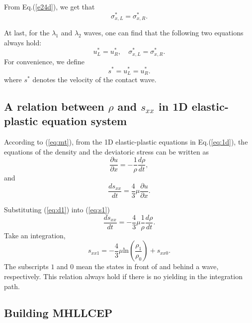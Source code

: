 \documentclass{article}
\numberwithin{equation}{section}
\numberwithin{table}{section}
\begin{document}
From  Eq.(\ref{e24d}), we  get that
\begin{equation}   \label{e27a}
\sigma_{x,L} ^{\ast}=  \sigma_{x,R} ^{\ast}.
\end{equation}


At last, for the $\lambda_{1}$ and $\lambda_{2}$ waves, one can find
that the following two equations always hold:
\begin{equation}   \label{e28}
u_{L}^{\ast}=u_{R}^{\ast}, \quad
\sigma_{x,L}^{\ast}=\sigma_{x,R}^{\ast}.
\end{equation}
For convenience, we define
\begin{equation}\label{eq:contact}
  s^* = u_L^* = u_R^*. %
\end{equation}
where $s^*$ denotes the velocity of the contact wave.
\subsection{A relation between $\rho$ and $s_{xx}$ in 1D elastic-plastic  equation system}

According  to (\ref{eq:mt}), from the 1D elastic-plastic  equations in Eq.(\ref{eq:1d}), the equations of the density and the deviatoric stress can be written as
  \begin{equation}\label{eq:d1}
	\frac{\partial u}{\partial x} = -\frac{1}{\rho}\frac{d\rho}{dt},
  \end{equation}
  and
  \begin{equation}\label{eq:s1}
	\frac{ds_{xx}}{dt}=\frac{4}{3}\mu\frac{\partial u}{\partial x}.
  \end{equation}

  Substituting (\ref{eq:d1}) into (\ref{eq:s1}) 
  \begin{equation}
	\frac{ds_{xx}}{dt}=-\frac{4}{3}\mu \frac{1}{\rho}\frac{d\rho}{dt}.
\end{equation}
Take an integration,
\begin{equation}\label{eq:rhosxx}
  s_{xx1}=-\frac{4}{3}\mu\text{ln}(\frac{\rho_{1}}{\rho_{0}})+s_{xx0}.
\end{equation}
The subscripts $1$ and $0$ mean the states in front of and behind a wave, respectively.
This relation always hold if there is no yielding in the integration path.

\subsection{Building MHLLCEP}
\end{document}
